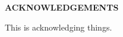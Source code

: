 \clearpage
\begin{centering}
\textbf{ACKNOWLEDGEMENTS}\\
\vspace{\baselineskip}
\end{centering}

This is acknowledging things.

\clearpage
